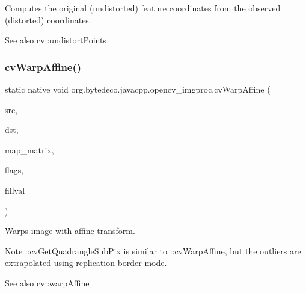 Computes the original (undistorted) feature coordinates from the observed (distorted) coordinates. 

\begin{DoxySeeAlso}{See also}
cv\+::undistort\+Points 
\end{DoxySeeAlso}
\mbox{\label{group__imgproc__c_gabf1cb9d4218222026652e60bea3c8b17}} 
\subsubsection{\texorpdfstring{cv\+Warp\+Affine()}{cvWarpAffine()}}
{\footnotesize\ttfamily static native void org.\+bytedeco.\+javacpp.\+opencv\+\_\+imgproc.\+cv\+Warp\+Affine (\begin{DoxyParamCaption}\item[{@Const Cv\+Arr}]{src,  }\item[{Cv\+Arr}]{dst,  }\item[{@Const Cv\+Mat}]{map\+\_\+matrix,  }\item[{int}]{flags,  }\item[{@By\+Val(null\+Value=\char`\"{}Cv\+Scalar(cv\+Scalar\+All(0))\char`\"{}) Cv\+Scalar}]{fillval }\end{DoxyParamCaption})\hspace{0.3cm}{\ttfamily [static]}}



Warps image with affine transform. 

\begin{DoxyNote}{Note}
\+::cv\+Get\+Quadrangle\+Sub\+Pix is similar to \+::cv\+Warp\+Affine, but the outliers are extrapolated using replication border mode. 
\end{DoxyNote}
\begin{DoxySeeAlso}{See also}
cv\+::warp\+Affine 
\end{DoxySeeAlso}
\mbox{\label{group__imgproc__c_ga77d2f4184f964c0a75b65d576b0fd417}} 
